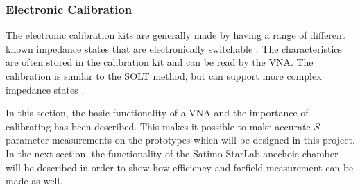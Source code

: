 \subsubsection{Electronic Calibration}
The electronic calibration kits are generally made by having a range of different known impedance states that are electronically switchable \cite{agilentEcal}. The characteristics are often stored in the calibration kit and can be read by the VNA. The calibration is similar to the SOLT method, but can support more complex impedance states \cite{agilentEcal}. 

\begin{aautail}
    In this section, the basic functionality of a VNA and the importance of calibrating has been described. This makes it possible to make accurate $S$-parameter measurements on the prototypes which will be designed in this project. In the next section, the functionality of the Satimo StarLab anechoic chamber will be described in order to show how efficiency and farfield measurement can be made as well.
\end{aautail}



